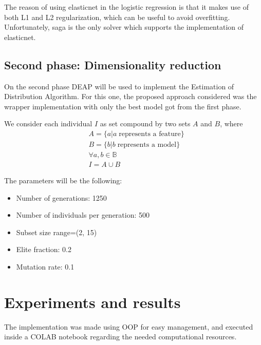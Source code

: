 \documentclass[10pt]{IEEEtran}
\begin{document}
The reason of using elasticnet in the logistic regression is that it makes
use of both L1 and L2 regularization, which can be useful to avoid overfitting.
Unfortunately, saga is the only solver which supports the implementation of elasticnet.

\subsection{ Second phase: Dimensionality reduction }
On the second phase DEAP \cite{deap_2012} will be used to implement the Estimation of Distribution
Algorithm.
For this one, the proposed approach considered was the wrapper implementation with only the
best model got from the first phase.

We consider each individual $I$ as set compound by two sets $A$ and $B$, where
\begin{equation}
\begin{aligned}
  &A = \{ a | a\; \text{represents a feature} \}\\
  &B = \{ b | b\; \text{represents a model} \}\\
  &\forall a,b \in \mathbb{B}\\
  &I = A \cup B
\end{aligned}
\end{equation}

The parameters will be the following:
\begin{itemize}
   \item Number of generations: 1250
   \item Number of individuals per generation: 500
   \item Subset size range=(2, 15)
   \item Elite fraction: 0.2
   \item Mutation rate: 0.1
\end{itemize}

\section{ Experiments and results }
The implementation was made using OOP for easy management, and executed
inside a COLAB notebook regarding the needed computational resources.
\end{document}
